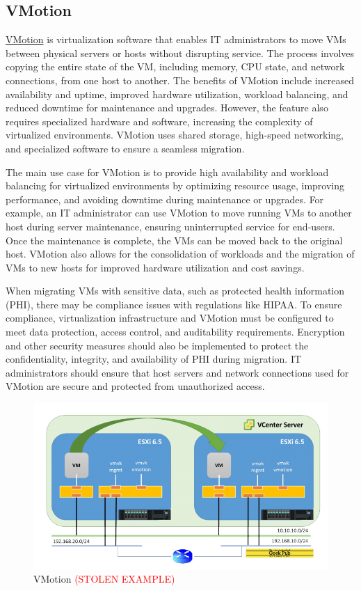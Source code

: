 \subsection{VMotion}
\href{https://www.vmware.com/products/vsphere/vmotion.html#:~:text=vMotion%20allows%20you%20to%3A,a%20virtual%20machine%20in%20seconds}{VMotion} is virtualization software that enables IT administrators to move VMs between physical servers or hosts without disrupting service. The process involves copying the entire state of the VM, including memory, CPU state, and network connections, from one host to another. The benefits of VMotion include increased availability and uptime, improved hardware utilization, workload balancing, and reduced downtime for maintenance and upgrades. However, the feature also requires specialized hardware and software, increasing the complexity of virtualized environments. VMotion uses shared storage, high-speed networking, and specialized software to ensure a seamless migration. 

The main use case for VMotion is to provide high availability and workload balancing for virtualized environments by optimizing resource usage, improving performance, and avoiding downtime during maintenance or upgrades. For example, an IT administrator can use VMotion to move running VMs to another host during server maintenance, ensuring uninterrupted service for end-users. Once the maintenance is complete, the VMs can be moved back to the original host. VMotion also allows for the consolidation of workloads and the migration of VMs to new hosts for improved hardware utilization and cost savings.

When migrating VMs with sensitive data, such as protected health information (PHI), there may be compliance issues with regulations like HIPAA. To ensure compliance, virtualization infrastructure and VMotion must be configured to meet data protection, access control, and auditability requirements. Encryption and other security measures should also be implemented to protect the confidentiality, integrity, and availability of PHI during migration. IT administrators should ensure that host servers and network connections used for VMotion are secure and protected from unauthorized access.

\begin{figure}[H]
    \centering
    \includegraphics[scale = .50]{images/vmotion.png}
    \caption{VMotion \textcolor{red}{(STOLEN EXAMPLE)} }
    \label{VMotion}
\end{figure}